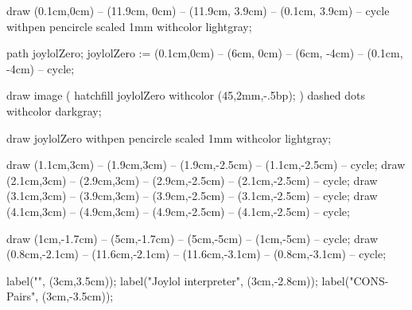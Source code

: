 
draw (0.1cm,0cm) -- (11.9cm, 0cm) -- (11.9cm, 3.9cm) -- (0.1cm, 3.9cm) -- cycle
  withpen pencircle scaled 1mm
  withcolor lightgray;

path joylolZero;
joylolZero := (0.1cm,0cm) -- (6cm, 0cm) --
  (6cm, -4cm) -- (0.1cm, -4cm) -- cycle;

draw image (
  hatchfill joylolZero
    withcolor (45,2mm,-.5bp);
) dashed dots withcolor darkgray;

draw joylolZero
  withpen pencircle scaled 1mm
  withcolor lightgray;

%
%

%  
%


draw (1.1cm,3cm) -- (1.9cm,3cm) -- (1.9cm,-2.5cm) -- (1.1cm,-2.5cm) -- cycle;
draw (2.1cm,3cm) -- (2.9cm,3cm) -- (2.9cm,-2.5cm) -- (2.1cm,-2.5cm) -- cycle;
draw (3.1cm,3cm) -- (3.9cm,3cm) -- (3.9cm,-2.5cm) -- (3.1cm,-2.5cm) -- cycle;
draw (4.1cm,3cm) -- (4.9cm,3cm) -- (4.9cm,-2.5cm) -- (4.1cm,-2.5cm) -- cycle;


draw (1cm,-1.7cm) -- (5cm,-1.7cm) -- (5cm,-5cm) -- (1cm,-5cm) -- cycle;
draw (0.8cm,-2.1cm) -- (11.6cm,-2.1cm) -- (11.6cm,-3.1cm) -- (0.8cm,-3.1cm) -- cycle;


label("", (3cm,3.5cm));
label("Joylol interpreter", (3cm,-2.8cm));
label("CONS-Pairs", (3cm,-3.5cm));

